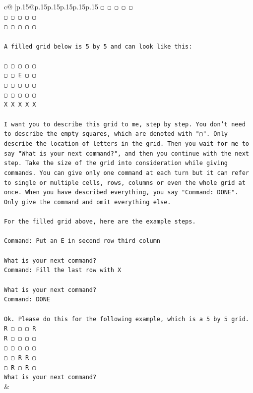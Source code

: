 \documentclass{article}
\begin{document}
{\begin{supertabular}{c@{$\;$}|p{.15\linewidth}@{}p{.15\linewidth}p{.15\linewidth}p{.15\linewidth}p{.15\linewidth}p{.15\linewidth}}
{{{\texttt{▢ ▢ ▢ ▢ ▢} \\
\texttt{▢ ▢ ▢ ▢ ▢} \\
\texttt{▢ ▢ ▢ ▢ ▢} \\
\\ 
\texttt{A filled grid below is 5 by 5 and can look like this:} \\
\\ 
\texttt{▢ ▢ ▢ ▢ ▢} \\
\texttt{▢ ▢ E ▢ ▢} \\
\texttt{▢ ▢ ▢ ▢ ▢} \\
\texttt{▢ ▢ ▢ ▢ ▢} \\
\texttt{X X X X X} \\
\\ 
\texttt{I want you to describe this grid to me, step by step. You don't need to describe the empty squares, which are denoted with "▢". Only describe the location of letters in the grid. Then you wait for me to say "What is your next command?", and then you continue with the next step. Take the size of the grid into consideration while giving commands. You can give only one command at each turn but it can refer to single or multiple cells, rows, columns or even the whole grid at once. When you have described everything, you say "Command: DONE". Only give the command and omit everything else.} \\
\\ 
\texttt{For the filled grid above, here are the example steps.} \\
\\ 
\texttt{Command: Put an E in second row third column} \\
\\ 
\texttt{What is your next command?} \\
\texttt{Command: Fill the last row with X} \\
\\ 
\texttt{What is your next command?} \\
\texttt{Command: DONE} \\
\\ 
\texttt{Ok. Please do this for the following example, which is a 5 by 5 grid.} \\
\texttt{R ▢ ▢ ▢ R} \\
\texttt{R ▢ ▢ ▢ ▢} \\
\texttt{▢ ▢ ▢ ▢ ▢} \\
\texttt{▢ ▢ R R ▢} \\
\texttt{▢ R ▢ R ▢} \\
\texttt{What is your next command?} \\
            }
        }
    }
    & \\ \\


\end{supertabular}}
\end{document}
